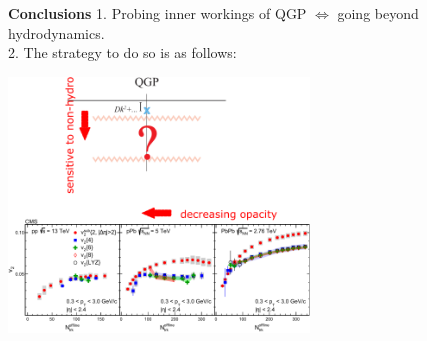 \documentclass[9pt,a4paper,unknownkeysallowed,xcolor=dvipsnames,aspectratio=43]{beamer}
\begin{document}
\begin{frame}{\bf\huge Conclusions}
\setcounter{page}{0}
\vspace{4mm}
{\color{teablue}1.} {\color{darkred}Probing inner workings of QGP $\Leftrightarrow$ going beyond hydrodynamics.}\\
\vspace{4mm}
{\color{teablue}2.} {\color{darkred} The strategy to do so is as follows:}\\
\vspace{2mm}
\begin{center}
\includegraphics[width=0.6\textwidth]{fig/goal}
\end{center}
\end{frame}
%
%
\end{document}
